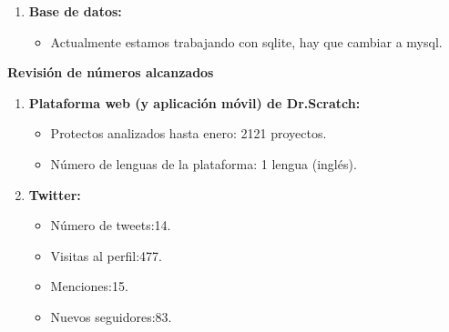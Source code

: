 \documentclass[a4paper,12pt]{letter}
\begin{document}
\begin{letter}
\begin{enumerate}
    \item {\textbf {Base de datos:}}
        \begin{itemize}
            \item {Actualmente estamos trabajando con sqlite, hay que cambiar a mysql.}
        \end{itemize}
\end{enumerate}

\textbf{{\LARGE Revisión de números alcanzados}}


\begin{enumerate}

    \item {\textbf {Plataforma web (y aplicación móvil) de Dr.Scratch:}}
        \begin{itemize}
            \item {Protectos analizados hasta enero: 2121 proyectos.}
            \item {Número de lenguas de la plataforma: 1 lengua (inglés).}
        \end{itemize}


    \item {\textbf {Twitter:}}
        \begin{itemize}
            \item {Número de tweets:14.}
            \item {Visitas al perfil:477.}
            \item {Menciones:15.}
            \item {Nuevos seguidores:83.}
        \end{itemize}


\end{enumerate}

\end{letter}
\end{document}
